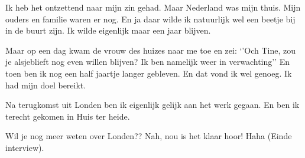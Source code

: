 Ik heb het ontzettend naar mijn zin gehad. Maar Nederland was mijn thuis. Mijn ouders en familie waren er nog. En ja daar wilde ik natuurlijk wel een beetje bij in de buurt zijn. Ik wilde eigenlijk maar een jaar blijven.

Maar op een dag kwam de vrouw des huizes naar me toe en zei: ‘’Och Tine, zou je alsjeblieft nog even willen blijven? Ik ben namelijk weer in verwachting’’ En toen ben ik nog een half jaartje langer gebleven. En dat vond ik wel genoeg. Ik had mijn doel bereikt. 

Na terugkomst uit Londen ben ik eigenlijk gelijk aan het werk gegaan. En ben ik terecht gekomen in Huis ter heide. 

Wil je nog meer weten over Londen?? Nah, nou is het klaar hoor! Haha (Einde interview).
